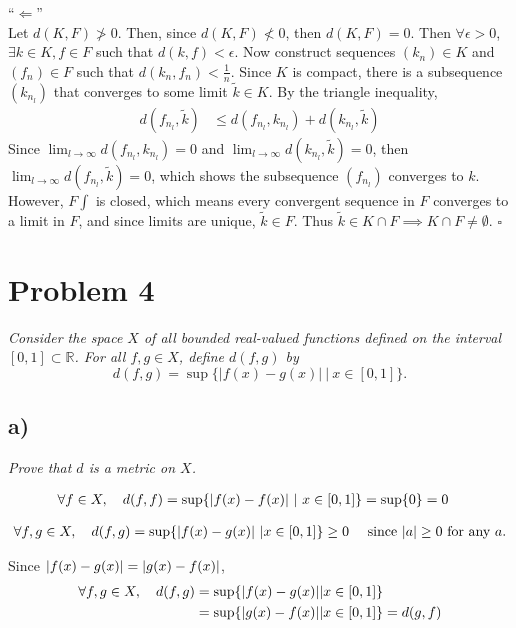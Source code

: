 \documentclass[12pt]{article}
\begin{document}
\noindent ``$\Longleftarrow$'' \\

Let $d(K, F) \not> 0$.  Then, since $d(K,F) \not< 0$, then $d(K,F) = 0$.  Then $\forall \epsilon > 0$, $\exists k \in K, f \in F$ such that $d(k, f) < \epsilon$.  Now construct sequences $(k_n) \in K$ and $(f_n) \in F$ such that $d(k_n, f_n) < \frac{1}{n}$.  Since $K$ is compact, there is a subsequence $(k_{n_l})$ that converges to some limit $\tilde{k} \in K$.  By the triangle inequality,
\begin{align*}
  d(f_{n_l}, \tilde{k}) &\leq d(f_{n_l}, k_{n_l}) + d(k_{n_l}, \tilde{k})
\end{align*}
Since $\lim_{l\rightarrow\infty} d(f_{n_l}, k_{n_l}) = 0$ and $\lim_{l\rightarrow\infty} d(k_{n_l}, \tilde{k}) = 0$, then $\lim_{l\rightarrow\infty} d(f_{n_l}, \tilde{k}) = 0$, which shows the subsequence $(f_{n_l})$ converges to $k$.  However, $F∫$ is closed, which means every convergent sequence in $F$ converges to a limit in $F$, and since limits are unique, $\tilde{k} \in F$.  Thus $\tilde{k} \in K \cap F \implies K \cap F \neq \emptyset$. \hfill $\square$

\section*{Problem 4}
{\it Consider the space $X$ of all bounded real-valued functions defined on the interval $[0,1] \subset \mathbb{R}$.  For all $f,g \in X$, define $d(f,g)$ by}
\begin{equation}
	\label{problem_4_definition}
	d(f, g) = \sup\{|f(x) - g(x)|\ |\ x \in [0,1]\}.
\end{equation}

\subsection*{ a)}
{\it Prove that $d$ is a metric on $X$.}

\begin{align*}
  \forall f \in X,\ \ \ d(f,f) &= \sup\{\abs{f(x) - f(x)}\ |\ x \in [0,1]\} = \sup\{0\} = 0
\end{align*}

\begin{align*}
  \forall f,g \in X,\ \ \ d(f,g) = \sup\{\abs{f(x) - g(x)}\ | x \in [0,1]\} \geq 0\ \ \ \ \text{since $\abs{a} \geq 0$ for any $a$.}
\end{align*}

Since $\abs{f(x) - g(x)} = \abs{g(x) - f(x)}$,
\begin{align*}
  \forall f,g \in X,\ \ \ d(f,g) &= \sup\{\abs{f(x) - g(x)} | x \in [0,1]\} \\
  &= \sup\{\abs{g(x) - f(x)} | x \in [0,1]\}  = d(g,f)
\end{align*}
\end{document}
